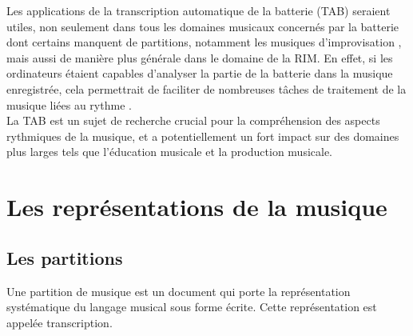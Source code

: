 Les applications de la transcription automatique de la
batterie (TAB) seraient utiles, non seulement dans tous les domaines musicaux
concernés par la batterie dont certains manquent de partitions, notamment les
musiques d’improvisation \cite{future_directions}, mais aussi de manière plus
générale dans le domaine de la RIM. En effet, si les ordinateurs étaient
capables d’analyser la partie de la batterie dans la musique enregistrée, cela
permettrait de faciliter de nombreuses tâches de traitement de la musique liées
au rythme \cite{Review_ADT}.\\

La TAB est un sujet de recherche crucial pour la compréhension des aspects
rythmiques de la musique, et a potentiellement un fort impact sur des domaines
plus larges tels que l’éducation musicale et la production musicale.

\section{Les représentations de la musique}
\subsection*{Les partitions}
Une partition de musique est un document qui porte la représentation
systématique du langage musical sous forme écrite. Cette représentation est
appelée transcription.

